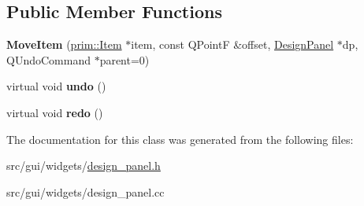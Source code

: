 \subsection*{Public Member Functions}
\begin{DoxyCompactItemize}
\item 
{\bfseries Move\+Item} (\hyperlink{classprim_1_1Item}{prim\+::\+Item} $\ast$item, const Q\+PointF \&offset, \hyperlink{classgui_1_1DesignPanel}{Design\+Panel} $\ast$dp, Q\+Undo\+Command $\ast$parent=0)\hypertarget{classgui_1_1DesignPanel_1_1MoveItem_ae2bb83fb36a4d0e181ae0b93a586bb00}{}\label{classgui_1_1DesignPanel_1_1MoveItem_ae2bb83fb36a4d0e181ae0b93a586bb00}

\item 
virtual void {\bfseries undo} ()\hypertarget{classgui_1_1DesignPanel_1_1MoveItem_a0f984a8fe07e3711a265891b0dccfe31}{}\label{classgui_1_1DesignPanel_1_1MoveItem_a0f984a8fe07e3711a265891b0dccfe31}

\item 
virtual void {\bfseries redo} ()\hypertarget{classgui_1_1DesignPanel_1_1MoveItem_ac14079a41a89257b4993b24d8abbfa93}{}\label{classgui_1_1DesignPanel_1_1MoveItem_ac14079a41a89257b4993b24d8abbfa93}

\end{DoxyCompactItemize}


The documentation for this class was generated from the following files\+:\begin{DoxyCompactItemize}
\item 
src/gui/widgets/\hyperlink{design__panel_8h}{design\+\_\+panel.\+h}\item 
src/gui/widgets/design\+\_\+panel.\+cc\end{DoxyCompactItemize}
